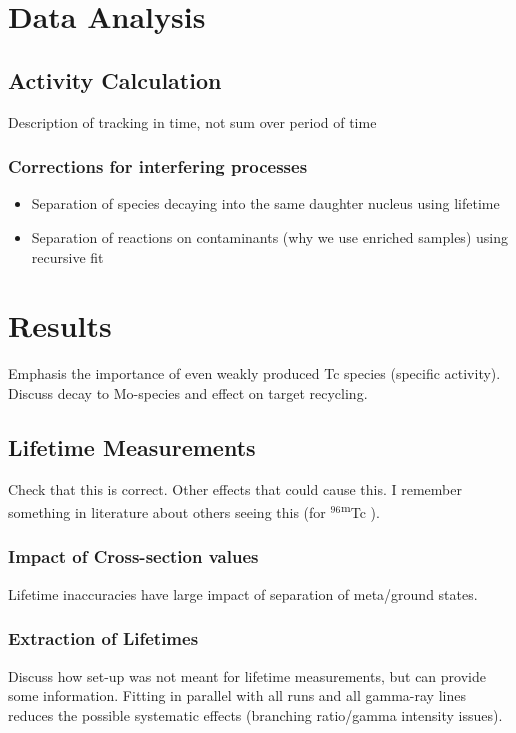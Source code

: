 \documentclass[final,3p,times,twocolumn,authoryear]{elsarticle_modified}
\newcommand{\mnuc}[2]{ {\normalfont $^{#1}$\textsuperscript{m}#2} }
\begin{document}
\section{Data Analysis}
\label{Analysis}

\subsection{Activity Calculation}
\label{Activity} 
Description of tracking in time, not sum over period of time
\subsubsection{Corrections for interfering processes}
\label{Interfering}
  \begin{itemize}
  \itemsep-0.5em 
   	\item Separation of species decaying into the same daughter nucleus using lifetime
  	\item Separation of reactions on contaminants (why we use enriched samples) using recursive fit
  \end{itemize}

\section{Results}
\label{Results}
Emphasis the importance of even weakly produced Tc species (specific activity). Discuss decay to Mo-species and effect on target recycling. 
\subsection{Lifetime Measurements}
\label{Lifetime}
Check that this is correct. Other effects that could cause this. I remember something in literature about others seeing this (for \mnuc{96}{Tc}).
	\subsubsection{Impact of Cross-section values}
	Lifetime inaccuracies have large impact of separation of meta/ground states. 
	\subsubsection{Extraction of Lifetimes}
	Discuss how set-up was not meant for lifetime measurements, but can provide some information. Fitting in parallel with all runs and all gamma-ray lines reduces the possible systematic effects (branching ratio/gamma intensity issues).
\end{document}
